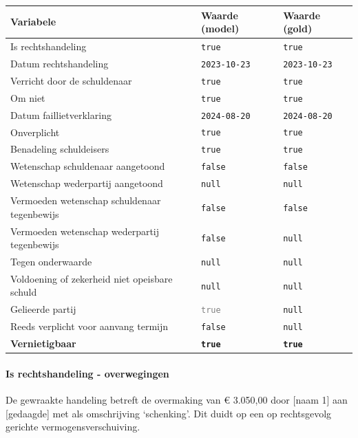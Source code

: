 \documentclass[
  dutch,
  a4paper,
]{article}
\begin{document}
\begin{center}
\small
\begin{tabular}{@{}p{7.4cm}p{2.6cm}p{2.6cm}@{}}
\toprule
Variabele & Waarde (model) & Waarde (gold) \\
\midrule
Is rechtshandeling & \texttt{true} & \texttt{true} \\
Datum rechtshandeling & \texttt{2023-10-23} & \texttt{2023-10-23} \\
Verricht door de schuldenaar & \texttt{true} & \texttt{true} \\
Om niet & \texttt{true} & \texttt{true} \\
Datum faillietverklaring & \texttt{2024-08-20} & \texttt{2024-08-20} \\
Onverplicht & \texttt{true} & \texttt{true} \\
Benadeling schuldeisers & \texttt{true} & \texttt{true} \\
Wetenschap schuldenaar aangetoond & \texttt{false} & \texttt{false} \\
Wetenschap wederpartij aangetoond & \texttt{null} & \texttt{null} \\
Vermoeden wetenschap schuldenaar tegenbewijs & \texttt{false} & \texttt{false} \\
Vermoeden wetenschap wederpartij tegenbewijs & \texttt{false} & \texttt{null} \\
Tegen onderwaarde & \texttt{null} & \texttt{null} \\
Voldoening of zekerheid niet opeisbare schuld & \texttt{null} & \texttt{null} \\
Gelieerde partij & \textcolor{gray}{\texttt{true}} & \texttt{null} \\
Reeds verplicht voor aanvang termijn & \texttt{false} & \texttt{null} \\
\textbf{Vernietigbaar} & \textbf{\texttt{true}} & \textbf{\texttt{true}} \\
\bottomrule
\end{tabular}
\end{center}

\paragraph{Is rechtshandeling - overwegingen}\label{is-rechtshandeling---overwegingen-28}

De gewraakte handeling betreft de overmaking van € 3.050,00 door {[}naam 1{]} aan {[}gedaagde{]} met als omschrijving `schenking'. Dit duidt op een op rechtsgevolg gerichte vermogensverschuiving.
\end{document}
